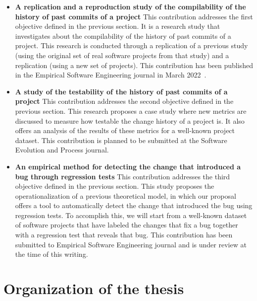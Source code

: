\begin{itemize}
    \item \textbf{A replication and a reproduction study of the compilability of the history of past commits of a project}
    This contribution addresses the first objective defined in the previous section.
    It is a research study that investigates about the compilability of the history of past commits of a project.
    This research is conducted through a replication of a previous study~\cite{tufano2017there} (using the original set of real software projects from that study) and a replication (using a new set of projects).
    This contribution has been published in the Empirical Software Engineering journal in March 2022~\cite{maes2022revisiting}.
    \item \textbf{A study of the testability of the history of past commits of a project}
    This contribution addresses the second objective defined in the previous section.
    This research proposes a case study where new metrics are discussed to measure how testable the change history of a project is. It also offers an analysis of the results of these metrics for a well-known project dataset.
    This contribution is planned to be submitted at the Software Evolution and Process journal.
    \item \textbf{An empirical method for detecting the change that introduced a bug through regression tests}
    This contribution addresses the third objective defined in the previous section. 
    This study proposes the operationalization of a previous theoretical model, in which our proposal offers a tool to automatically detect the change that introduced the bug using regression tests. 
    To accomplish this, we will start from a well-known dataset of software projects that have labeled the changes that fix a bug together with a regression test that reveals that bug.
    This contribution has been submitted to Empirical Software Engineering journal and is under review at the time of this writing.
\end{itemize}

\section{Organization of the thesis}

